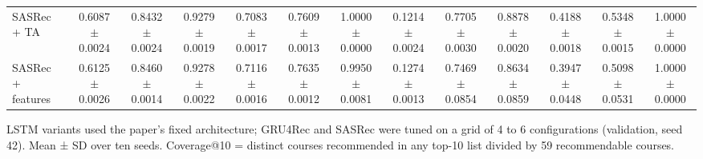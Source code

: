 \begin{table}[t]
\begin{tabular}{lcccccccccccc}
SASRec + TA & 0.6087 $\pm$ 0.0024 & 0.8432 $\pm$ 0.0024 & 0.9279 $\pm$ 0.0019 & 0.7083 $\pm$ 0.0017 & 0.7609 $\pm$ 0.0013 & 1.0000 $\pm$ 0.0000 & 0.1214 $\pm$ 0.0024 & 0.7705 $\pm$ 0.0030 & 0.8878 $\pm$ 0.0020 & 0.4188 $\pm$ 0.0018 & 0.5348 $\pm$ 0.0015 & 1.0000 $\pm$ 0.0000 \\
SASRec + features & 0.6125 $\pm$ 0.0026 & 0.8460 $\pm$ 0.0014 & 0.9278 $\pm$ 0.0022 & 0.7116 $\pm$ 0.0016 & 0.7635 $\pm$ 0.0012 & 0.9950 $\pm$ 0.0081 & 0.1274 $\pm$ 0.0013 & 0.7469 $\pm$ 0.0854 & 0.8634 $\pm$ 0.0859 & 0.3947 $\pm$ 0.0448 & 0.5098 $\pm$ 0.0531 & 1.0000 $\pm$ 0.0000 \\
\bottomrule
\end{tabular}
\par\smallskip\footnotesize LSTM variants used the paper's fixed architecture; GRU4Rec and SASRec were tuned on a grid of 4 to 6 configurations (validation, seed 42). Mean ± SD over ten seeds. Coverage@10 = distinct courses recommended in any top-10 list divided by 59 recommendable courses.
\end{table}